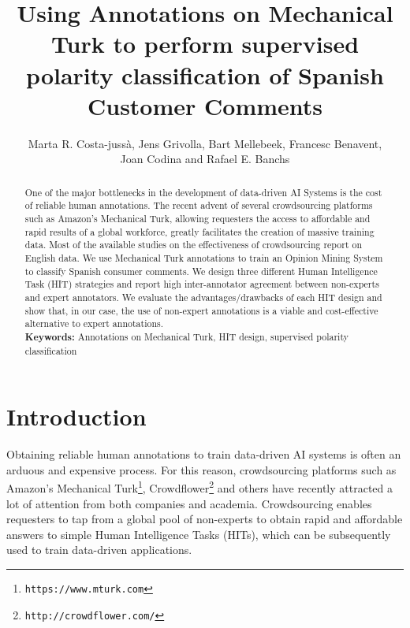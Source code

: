 \documentclass[11pt]{elsarticle}
\begin{document}
\title{Using Annotations on Mechanical Turk to perform supervised polarity classification of Spanish Customer Comments}

\author{Marta R. Costa-juss\`a, Jens Grivolla, Bart Mellebeek, Francesc Benavent,\\ Joan Codina and Rafael E. Banchs }
\address{       Institute for Infocomm Research,\\ Singapore 138632\\ another\\
vismrc@i2r.a-star.edu.sg \\}

\begin{abstract}
 One of the major bottlenecks in the development of data-driven AI Systems is the cost of reliable human annotations. The recent advent of several crowdsourcing platforms such as Amazon's Mechanical Turk, allowing requesters the access to affordable and rapid results of a global workforce, greatly facilitates the creation of massive training data. Most of the available studies on the effectiveness of crowdsourcing report on English data. We use Mechanical Turk annotations to train an Opinion Mining System to classify Spanish consumer comments. We design three different Human Intelligence Task (HIT) strategies and report high inter-annotator agreement between non-experts and expert annotators. We evaluate the advantages/drawbacks of each HIT design and show that, in our case, the use of non-expert annotations is a viable and cost-effective alternative to expert annotations. \\ \textbf{Keywords:} Annotations on Mechanical Turk, HIT design, supervised polarity classification
\end{abstract}

\maketitle




\section{Introduction}
\label{sec:intro}


Obtaining reliable human annotations to train data-driven AI systems is often an arduous and expensive process. For this reason, crowdsourcing platforms such as Amazon's Mechanical Turk\footnote{\texttt{https://www.mturk.com}}, Crowdflower\footnote{\texttt{http://crowdflower.com/}} and others have recently attracted a lot of attention from both companies and academia. Crowdsourcing enables requesters to tap from a global pool of non-experts to obtain rapid and affordable answers to simple Human Intelligence Tasks (HITs), which can be subsequently used to train data-driven applications. 
\end{document}
